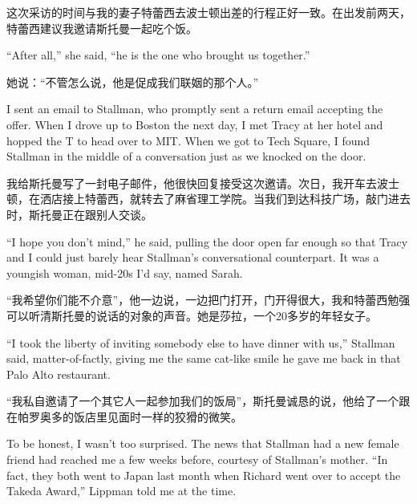 \ifdefined\chs
这次采访的时间与我的妻子特蕾西去波士顿出差的行程正好一致。在出发前两天，特蕾西建议我邀请斯托曼一起吃个饭。
\fi

\ifdefined\eng
``After all,'' she said, ``he is the one who brought us together.''
\fi

\ifdefined\chs
她说：“不管怎么说，他是促成我们联姻的那个人。”
\fi

\ifdefined\eng
I sent an email to Stallman, who promptly sent a return email accepting the offer. When I drove up to Boston the next day, I met Tracy at her hotel and hopped the T to head over to MIT. When we got to Tech Square, I found Stallman in the middle of a conversation just as we knocked on the door.
\fi

\ifdefined\chs
我给斯托曼写了一封电子邮件，他很快回复接受这次邀请。次日，我开车去波士顿，在洒店接上特蕾西，就转去了麻省理工学院。当我们到达科技广场，敲门进去时，斯托曼正在跟别人交谈。
\fi

\ifdefined\eng
``I hope you don't mind,'' he said, pulling the door open far enough so that Tracy and I could just barely hear Stallman's conversational counterpart. It was a youngish woman, mid-20s I'd say, named Sarah.
\fi

\ifdefined\chs
“我希望你们能不介意”，他一边说，一边把门打开，门开得很大，我和特蕾西勉强可以听清斯托曼的说话的对象的声音。她是莎拉，一个20多岁的年轻女子。
\fi

\ifdefined\eng
``I took the liberty of inviting somebody else to have dinner with us,'' Stallman said, matter-of-factly, giving me the same cat-like smile he gave me back in that Palo Alto restaurant.
\fi

\ifdefined\chs
“我私自邀请了一个其它人一起参加我们的饭局”，斯托曼诚恳的说，他给了一个跟在帕罗奥多的饭店里见面时一样的狡猾的微笑。
\fi

\ifdefined\eng
To be honest, I wasn't too surprised. The news that Stallman had a new female friend had reached me a few weeks before, courtesy of Stallman's mother. ``In fact, they both went to Japan last month when Richard went over to accept the Takeda Award,'' Lippman told me at the time.
\fi

